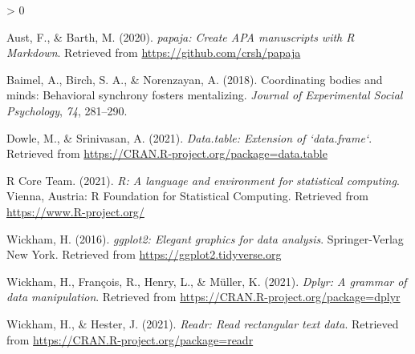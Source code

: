 \documentclass[
  english,
  man,floatsintext]{apa6}
\newlength{\cslhangindent}
\newenvironment{CSLReferences}[2] %
 {%
  \setlength{\parindent}{0pt}
  \ifodd #1 \everypar{\setlength{\hangindent}{\cslhangindent}}\ignorespaces\fi
  \ifnum #2 > 0
  \setlength{\parskip}{#2\baselineskip}
  \fi
 }%
 {}
\begin{document}
\hypertarget{refs}{}
\begin{CSLReferences}{1}{0}
\leavevmode\hypertarget{ref-R-papaja}{}%
Aust, F., \& Barth, M. (2020). \emph{{papaja}: {Create} {APA} manuscripts with {R Markdown}}. Retrieved from \url{https://github.com/crsh/papaja}

\leavevmode\hypertarget{ref-baimel2018coordinating}{}%
Baimel, A., Birch, S. A., \& Norenzayan, A. (2018). Coordinating bodies and minds: Behavioral synchrony fosters mentalizing. \emph{Journal of Experimental Social Psychology}, \emph{74}, 281--290.

\leavevmode\hypertarget{ref-R-data.table}{}%
Dowle, M., \& Srinivasan, A. (2021). \emph{Data.table: Extension of `data.frame`}. Retrieved from \url{https://CRAN.R-project.org/package=data.table}

\leavevmode\hypertarget{ref-R-base}{}%
R Core Team. (2021). \emph{R: A language and environment for statistical computing}. Vienna, Austria: R Foundation for Statistical Computing. Retrieved from \url{https://www.R-project.org/}

\leavevmode\hypertarget{ref-R-ggplot2}{}%
Wickham, H. (2016). \emph{ggplot2: Elegant graphics for data analysis}. Springer-Verlag New York. Retrieved from \url{https://ggplot2.tidyverse.org}

\leavevmode\hypertarget{ref-R-dplyr}{}%
Wickham, H., François, R., Henry, L., \& Müller, K. (2021). \emph{Dplyr: A grammar of data manipulation}. Retrieved from \url{https://CRAN.R-project.org/package=dplyr}

\leavevmode\hypertarget{ref-R-readr}{}%
Wickham, H., \& Hester, J. (2021). \emph{Readr: Read rectangular text data}. Retrieved from \url{https://CRAN.R-project.org/package=readr}

\end{CSLReferences}

\endgroup
\end{document}
